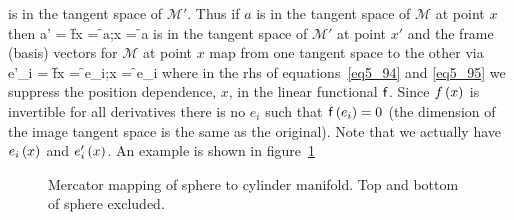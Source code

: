 is in the tangent space of $\mathcal{M}'$.  Thus if $a$ is in
the tangent space of $\mathcal{M}$ at point $x$ then
\be\label{eq5_94}
 a' = \f{f}{x} = \f{\sff}{a;x} = \f{\sff}{a}
\ee
is in the tangent space of $\mathcal{M}'$ at point $x'$ and the frame (basis) vectors for $\mathcal{M}$ at point $x$ map from one tangent
space to the other via
\be\label{eq5_95}
 e'_{i} = \f{f}{x} = \f{\sff}{e_{i};x} = \f{\sff}{e_{i}}
\ee
where in the rhs of equations~\ref{eq5_94} and \ref{eq5_95} we suppress the position dependence, $x$, in the linear functional $\mathsf{f}$. Since
${f}\left ( {x} \right )$ is invertible for all derivatives there is no $e_{i}$ such that ${\mathsf{f}}\left ( {e_{i}} \right )=0$ (the dimension of the image tangent space is
the same as the original).  Note that we actually have ${e_{i}}\left ( {x} \right )$ and  ${e'_{i}}\left ( {x} \right )$. An example is shown in figure~\ref{mercator}

\begin{figure}[tbp]
\begin{center}
\vspace{-0.5in}
\caption{Mercator mapping of sphere to cylinder manifold. Top and bottom of sphere excluded.}\label{mercator}
\end{center}
\end{figure} 

